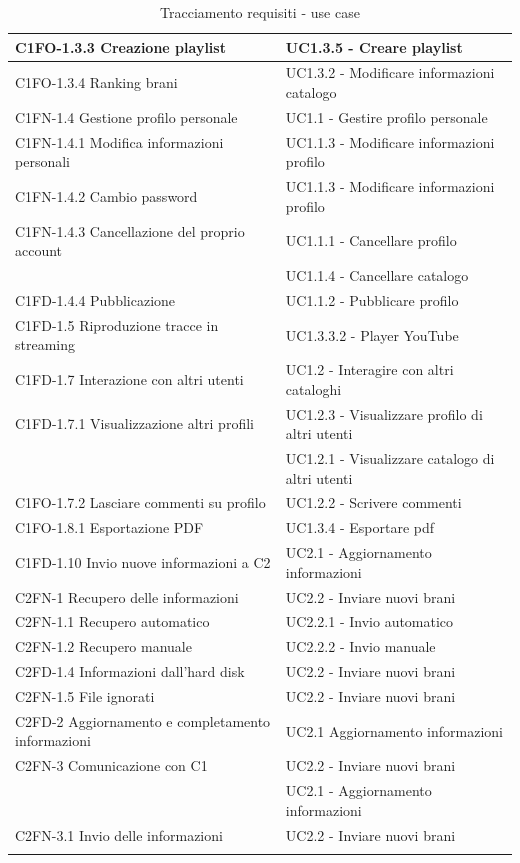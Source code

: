 \begin{footnotesize}
\begin{longtable}[!h]{|l|l|}
C1FO-1.3.3 Creazione playlist & UC1.3.5 - Creare playlist \\ \hline 
C1FO-1.3.4 Ranking brani & UC1.3.2 - Modificare informazioni catalogo \\ \hline 
C1FN-1.4 Gestione profilo personale & UC1.1 - Gestire profilo personale \\
\hline 
C1FN-1.4.1 Modifica informazioni personali & UC1.1.3 - Modificare informazioni
profilo \\ \hline
C1FN-1.4.2 Cambio password & UC1.1.3 - Modificare informazioni
profilo \\ \hline
C1FN-1.4.3 Cancellazione del proprio account & UC1.1.1 - Cancellare profilo \\
& UC1.1.4 - Cancellare catalogo \\ \hline
C1FD-1.4.4 Pubblicazione & UC1.1.2 - Pubblicare profilo \\ \hline
C1FD-1.5 Riproduzione tracce in streaming & UC1.3.3.2 - Player YouTube \\ \hline
C1FD-1.7 Interazione con altri utenti & UC1.2 - Interagire con altri cataloghi
\\ \hline 
C1FD-1.7.1 Visualizzazione altri profili & UC1.2.3 - Visualizzare profilo
di altri utenti \\
& UC1.2.1 - Visualizzare catalogo di altri utenti \\ \hline
C1FO-1.7.2 Lasciare commenti su profilo & UC1.2.2 - Scrivere commenti \\ \hline
C1FO-1.8.1 Esportazione PDF & UC1.3.4 - Esportare pdf \\ \hline
C1FD-1.10 Invio nuove informazioni a C2 & UC2.1 - Aggiornamento informazioni \\
\hline
C2FN-1 Recupero delle informazioni & UC2.2 - Inviare nuovi brani \\
\hline
C2FN-1.1 Recupero automatico & UC2.2.1 - Invio automatico \\ \hline
C2FN-1.2 Recupero manuale & UC2.2.2 - Invio manuale \\ \hline
C2FD-1.4 Informazioni dall'hard disk & UC2.2 - Inviare nuovi brani \\
\hline
C2FN-1.5 File ignorati & UC2.2 - Inviare nuovi brani \\ \hline
C2FD-2 Aggiornamento e completamento informazioni & UC2.1 Aggiornamento
informazioni \\ \hline 
C2FN-3 Comunicazione con C1 & UC2.2 - Inviare nuovi brani \\
& UC2.1 - Aggiornamento informazioni \\ \hline 
C2FN-3.1 Invio delle informazioni & UC2.2 - Inviare nuovi brani \\
\hline
\caption{Tracciamento requisiti - use case}
\end{longtable}
\end{footnotesize}

